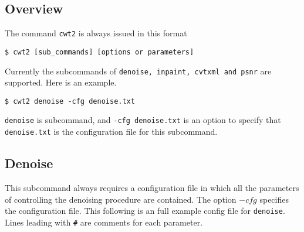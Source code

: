 \documentclass[a4paper,5pt]{article}
\begin{document}
\subsection{Overview}

The command \lstinline{cwt2} is always issued in this format

\lstinline{$ cwt2 [sub_commands] [options or parameters]}

Currently the subcommands of \lstinline{denoise, inpaint, cvtxml and psnr} are supported. Here is an example.

\lstinline{$ cwt2 denoise -cfg denoise.txt}

\lstinline{denoise} is subcommand, and \lstinline{-cfg denoise.txt} is an option to specify that \lstinline{denoise.txt} is the configuration file for this subcommand.

\subsection{Denoise}
This subcommand always requires a configuration file in which all the parameters of controlling the denoising procedure are contained. The option $-cfg$ specifies the configuration file. This following is an full example config file for \lstinline{denoise}. Lines leading with \lstinline{#} are comments for each parameter.
\end{document}
